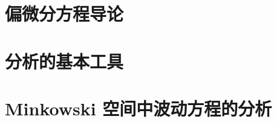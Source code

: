 \documentclass[
  BookTitleCN={分析讲义},
  BookTitleEN={LECTURE NOTES IN ANALYSIS (2011)},
  OriginalAuthor={Sergiu Klainerman},
  OriginalEdition={2011 年讲义(普林斯顿大学)},
  OriginalPublisher={Princeton University},
  OriginalYear={2011},
  Translator={Fingolfin},
  ModelUsed={DeepSeek-V4-Flash+混元3},
  TranslationDate={28 Aug 2026}
]{mathtranslation}
\begin{document}
\hfill \TranslationDate

\newpage
\begingroup
\pagestyle{empty}
\thispagestyle{empty}
\tableofcontents
\clearpage
\endgroup

\setcounter{page}{1}
\pagestyle{fancy}


\part{偏微分方程导论}







\part{分析的基本工具}






\part{Minkowski 空间中波动方程的分析}






\appendix


\clearpage

\printterminology
\end{document}
